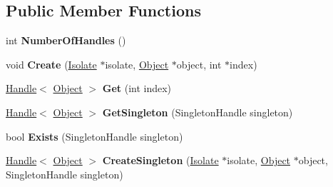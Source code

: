 \subsection*{Public Member Functions}
\begin{DoxyCompactItemize}
\item 
\hypertarget{classv8_1_1internal_1_1_eternal_handles_a2831b3a300390e2cb714f4dc1909d46b}{}int {\bfseries Number\+Of\+Handles} ()\label{classv8_1_1internal_1_1_eternal_handles_a2831b3a300390e2cb714f4dc1909d46b}

\item 
\hypertarget{classv8_1_1internal_1_1_eternal_handles_acf384364f5e06b605be609f0323b6c9a}{}void {\bfseries Create} (\hyperlink{classv8_1_1internal_1_1_isolate}{Isolate} $\ast$isolate, \hyperlink{classv8_1_1internal_1_1_object}{Object} $\ast$object, int $\ast$index)\label{classv8_1_1internal_1_1_eternal_handles_acf384364f5e06b605be609f0323b6c9a}

\item 
\hypertarget{classv8_1_1internal_1_1_eternal_handles_a5ddad5d646481d8b7a3bd966ad44d2f7}{}\hyperlink{classv8_1_1internal_1_1_handle}{Handle}$<$ \hyperlink{classv8_1_1internal_1_1_object}{Object} $>$ {\bfseries Get} (int index)\label{classv8_1_1internal_1_1_eternal_handles_a5ddad5d646481d8b7a3bd966ad44d2f7}

\item 
\hypertarget{classv8_1_1internal_1_1_eternal_handles_af981c2866ed0a695436eea4c437d0fc4}{}\hyperlink{classv8_1_1internal_1_1_handle}{Handle}$<$ \hyperlink{classv8_1_1internal_1_1_object}{Object} $>$ {\bfseries Get\+Singleton} (Singleton\+Handle singleton)\label{classv8_1_1internal_1_1_eternal_handles_af981c2866ed0a695436eea4c437d0fc4}

\item 
\hypertarget{classv8_1_1internal_1_1_eternal_handles_a00bf7bf1b63a9f22de5385e7c8bccf2a}{}bool {\bfseries Exists} (Singleton\+Handle singleton)\label{classv8_1_1internal_1_1_eternal_handles_a00bf7bf1b63a9f22de5385e7c8bccf2a}

\item 
\hypertarget{classv8_1_1internal_1_1_eternal_handles_a1e9372860584dde0598dc98500184d12}{}\hyperlink{classv8_1_1internal_1_1_handle}{Handle}$<$ \hyperlink{classv8_1_1internal_1_1_object}{Object} $>$ {\bfseries Create\+Singleton} (\hyperlink{classv8_1_1internal_1_1_isolate}{Isolate} $\ast$isolate, \hyperlink{classv8_1_1internal_1_1_object}{Object} $\ast$object, Singleton\+Handle singleton)\label{classv8_1_1internal_1_1_eternal_handles_a1e9372860584dde0598dc98500184d12}


\end{DoxyCompactItemize}

